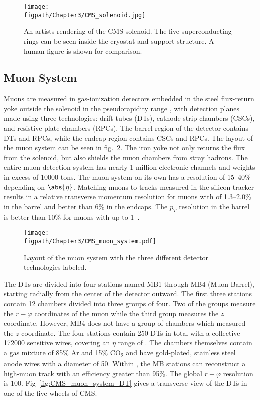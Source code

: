 \begin{figure}[!hbt]
    \centering
    \texttt{[image: \\figpath/Chapter3/CMS\_solenoid.jpg]}
    \caption{An artists rendering of the CMS solenoid. The five superconducting rings can be seen inside the cryostat and support structure. A human figure is shown for comparison.}
    \label{fig:CMS_solenoid}
\end{figure}

\subsection{Muon System}

Muons are measured in gas-ionization detectors embedded in the steel flux-return yoke outside the solenoid in the pseudorapidity range , with detection planes made using three technologies: drift tubes (DTs), cathode strip chambers (CSCs), and resistive plate chambers (RPCs).
The barrel region of the detector contains DTs and RPCs, while the endcap region contains CSCs and RPCs.
The layout of the muon system can be seen in fig.~\ref{fig:CMS_muon_system}.
The iron yoke not only returns the flux from the solenoid, but also shields the muon chambers from stray hadrons.
The entire muon detection system has nearly 1 million electronic channels and weights in excess of 10000 tons.
The muon system on its own has a resolution of 15--40\% depending on $\abs{\eta}$.
Matching muons to tracks measured in the silicon tracker results in a relative transverse momentum resolution for muons with \GeV of 1.3--2.0\% in the barrel and better than 6\% in the endcaps. The $p_{T}$ resolution in the barrel is better than 10\% for muons with \pt up to 1\TeV~\cite{Chatrchyan:2012xi}.

\begin{figure}[!hbt]
    \centering
    \texttt{[image: \\figpath/Chapter3/CMS\_muon\_system.pdf]}
    \caption{Layout of the muon system with the three different detector technologies labeled.}
    \label{fig:CMS_muon_system}
\end{figure}

The DTs are divided into four stations named MB1 through MB4 (Muon Barrel), starting radially from the center of the detector outward.
The first three stations contain 12 chambers divided into three groups of four.
Two of the groups measure the $r-\varphi$ coordinates of the muon while the third group measures the $z$ coordinate.
However, MB4 does not have a group of chambers which measured the $z$ coordinate.
The four stations contain 250 DTs in total with a collective 172000 sensitive wires, covering an $\eta$ range of .
The chambers themselves contain a gas mixture of 85\% Ar and 15\% CO\textsubscript{2} and have gold-plated, stainless steel anode wires with a diameter of 50\mum.
Within , the MB stations can reconstruct a high-\pt muon track with an efficiency greater than 95\%.
The global $r-\varphi$ resolution is 100\mum.
Fig~\ref{fig:CMS_muon_system_DT} gives a transverse view of the DTs in one of the five wheels of CMS.

